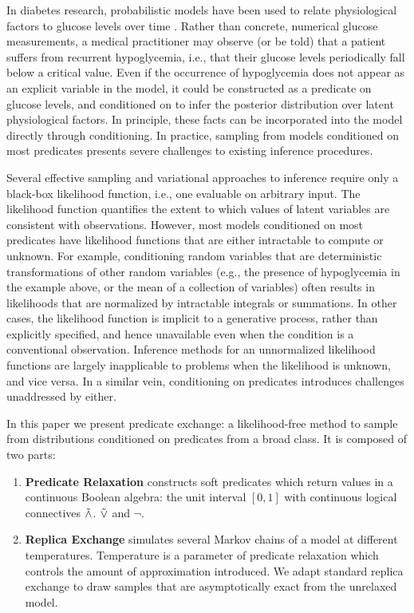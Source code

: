In diabetes research, probabilistic models have been used to relate physiological factors to glucose levels over time \citep{levine2017offline,murata2004probabilistic}.
Rather than concrete, numerical glucose measurements, a medical practitioner may observe (or be told) that a patient suffers from recurrent hypoglycemia, i.e., that their glucose levels periodically fall below a critical value.
Even if the occurrence of hypoglycemia does not appear as an explicit variable in the model, it could be constructed as a predicate on glucose levels, and conditioned on to infer the posterior distribution over latent physiological factors.
In principle, these facts can be incorporated into the model directly through conditioning.	
In practice, sampling from models conditioned on most predicates presents severe challenges to existing inference procedures.


Several effective sampling  \citep{andrieu2003introduction} and variational  \citep{jordan1999introduction, ranganath2014black} approaches to inference require only a black-box likelihood function, i.e., one evaluable on arbitrary input.
The likelihood function quantifies the extent to which values of latent variables are consistent with observations. 
However, most models conditioned on most predicates have likelihood functions that are either intractable to compute or unknown.
For example, conditioning random variables that are deterministic transformations of other random variables (e.g., the presence of hypoglycemia in the example above, or the mean of a collection of variables) often results in likelihoods that are normalized by intractable integrals or summations.	
In other cases, the likelihood function is implicit to a generative process, rather than explicitly specified, and hence unavailable even when the condition is a conventional observation.
Inference methods for an unnormalized likelihood functions are largely inapplicable to problems  when the likelihood is unknown, and vice versa.
In a similar vein, conditioning on predicates introduces challenges unaddressed by either.

In this paper we present predicate exchange:
a likelihood-free method to sample from distributions conditioned on predicates from a broad class.
It is composed of two parts:
\begin{enumerate}
\item \textbf{Predicate Relaxation} constructs soft predicates which return values in a continuous Boolean algebra: the unit interval $[0, 1]$ with continuous logical connectives $\mathrel{\tilde{\land}}$. $\mathrel{\tilde{\lor}}$ and $\neg$.
\item  \textbf{Replica Exchange} simulates several Markov chains of a model at different temperatures.  Temperature is a parameter of predicate relaxation which controls the amount of approximation introduced.  We adapt standard replica exchange to draw samples that are asymptotically exact from the unrelaxed model. 
\end{enumerate}


